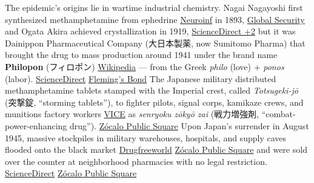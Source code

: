 The epidemic's origins lie in wartime industrial chemistry. Nagai Nagayoshi first synthesized methamphetamine from ephedrine \href{https://bsd.neuroinf.jp/wiki/\%E8\%A6\%9A\%E9\%86\%92\%E5\%89\%A4}{Neuroinf} in 1893, \href{https://www.globalsecurity.org/military/world/japan/history-20c-drugs.htm}{Global Security} and Ogata Akira achieved crystallization in 1919, \href{https://www.sciencedirect.com/science/article/abs/pii/S095539591200196X}{ScienceDirect +2} but it was Dainippon Pharmaceutical Company (大日本製薬, now Sumitomo Pharma) that brought the drug to mass production around 1941 under the brand name \textbf{Philopon} (フィロポン) \href{https://en.wikipedia.org/wiki/Dainippon_Pharmaceuticals}{Wikipedia} --- from the Greek \emph{philo} (love) + \emph{ponos} (labor). \href{https://www.sciencedirect.com/science/article/abs/pii/S095539591200196X}{ScienceDirect} \href{https://flemingsbond.wpcomstaging.com/philopon-a-japanese-murder-drug/}{Fleming's Bond} The Japanese military distributed methamphetamine tablets stamped with the Imperial crest, called \emph{Totsugeki-jō} (突撃錠, ``storming tablets''), to fighter pilots, signal corps, kamikaze crews, and munitions factory workers \href{https://www.vice.com/en/article/how-stigma-created-japans-hidden-drug-problem/}{VICE} as \emph{senryoku zōkyō zai} (戦力増強剤, ``combat-power-enhancing drug''). \href{https://www.zocalopublicsquare.org/the-world-war-ii-wonder-drug-that-never-left-japan/}{Zócalo Public Square} Upon Japan's surrender in August 1945, massive stockpiles in military warehouses, hospitals, and supply caves flooded onto the black market \href{https://jp.drugfreeworld.org/drugfacts/crystalmeth/history-of-methamphetamine.html}{Drugfreeworld} \href{https://www.zocalopublicsquare.org/the-world-war-ii-wonder-drug-that-never-left-japan/}{Zócalo Public Square} and were sold over the counter at neighborhood pharmacies with no legal restriction. \href{https://www.sciencedirect.com/science/article/abs/pii/S095539591200196X}{ScienceDirect} \href{https://www.zocalopublicsquare.org/the-world-war-ii-wonder-drug-that-never-left-japan/}{Zócalo Public Square}


